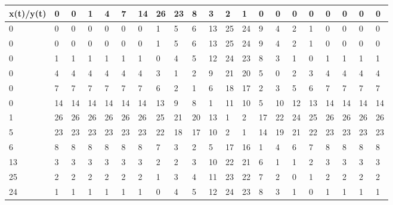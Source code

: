 \usepackage[table,xcdraw]{xcolor}
\usepackage{adjustbox}
%
\begin{adjustbox}{width=\textwidth,totalheight=\textheight,keepaspectratio}
    \begin{tabular}{l|llllllllllllllllllll}
    x(t)/y(t) & 0  & 0  & 1  & 4  & 7  & 14 & 26 & 23 & 8  & 3  & 2  & 1  & 0  & 0  & 0  & 0  & 0  & 0  & 0  & 0  \\ \hline
    0         & \cellcolor[HTML]{EFEFEF}0  & 0  & 0  & 0  & 0  & 0  & 1  & 5  & 6  & 13 & 25 & 24 & 9  & 4  & 2  & 1  & 0  & 0  & 0  & 0  \\
    0         & 0  &\cellcolor[HTML]{EFEFEF} 0  & \cellcolor[HTML]{EFEFEF}0  & \cellcolor[HTML]{EFEFEF}0  &\cellcolor[HTML]{EFEFEF} 0  &\cellcolor[HTML]{EFEFEF} 0  & 1  & 5  & 6  & 13 & 25 & 24 & 9  & 4  & 2  & 1  & 0  & 0  & 0  & 0  \\
    0         & 1  & 1  & 1  & 1  & 1  & 1  &\cellcolor[HTML]{EFEFEF} 0  & 4  & 5  & 12 & 24 & 23 & 8  & 3  & 1  & 0  & 1  & 1  & 1  & 1  \\
    0         & 4  & 4  & 4  & 4  & 4  & 4  & 3  &\cellcolor[HTML]{EFEFEF} 1  & 2  & 9  & 21 & 20 & 5  & 0  & 2  & 3  & 4  & 4  & 4  & 4  \\
    0         & 7  & 7  & 7  & 7  & 7  & 7  & 6  & 2  &\cellcolor[HTML]{EFEFEF} 1  & 6  & 18 & 17 & 2  & 3  & 5  & 6  & 7  & 7  & 7  & 7  \\
    0         & 14 & 14 & 14 & 14 & 14 & 14 & 13 & 9  & 8  &\cellcolor[HTML]{EFEFEF} 1  & 11 & 10 & 5  & 10 & 12 & 13 & 14 & 14 & 14 & 14 \\
    1         & 26 & 26 & 26 & 26 & 26 & 26 & 25 & 21 & 20 & 13 &\cellcolor[HTML]{EFEFEF} 1  & 2  & 17 & 22 & 24 & 25 & 26 & 26 & 26 & 26 \\
    5         & 23 & 23 & 23 & 23 & 23 & 23 & 22 & 18 & 17 & 10 & 2  &\cellcolor[HTML]{EFEFEF} 1  & 14 & 19 & 21 & 22 & 23 & 23 & 23 & 23 \\
    6         & 8  & 8  & 8  & 8  & 8  & 8  & 7  & 3  & 2  & 5  & 17 & 16 &\cellcolor[HTML]{EFEFEF} 1  & 4  & 6  & 7  & 8  & 8  & 8  & 8  \\
    13        & 3  & 3  & 3  & 3  & 3  & 3  & 2  & 2  & 3  & 10 & 22 & 21 & 6  &\cellcolor[HTML]{EFEFEF} 1  & 1  & 2  & 3  & 3  & 3  & 3  \\
    25        & 2  & 2  & 2  & 2  & 2  & 2  & 1  & 3  & 4  & 11 & 23 & 22 & 7  & 2  & \cellcolor[HTML]{EFEFEF}0  & 1  & 2  & 2  & 2  & 2  \\
    24        & 1  & 1  & 1  & 1  & 1  & 1  & 0  & 4  & 5  & 12 & 24 & 23 & 8  & 3  & 1  &\cellcolor[HTML]{EFEFEF} 0  & 1  & 1  & 1  & 1  \\

\end{tabular}
\end{adjustbox}
